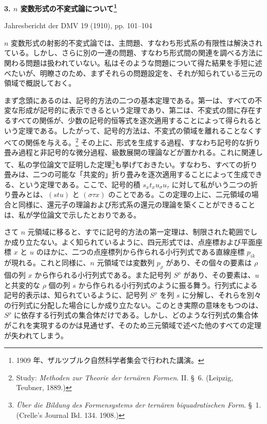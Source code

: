 \documentclass[11pt]{jlreq}
\newcommand{\pair}[2]{(#1\,|\,#2)}
\newcommand{\eps}{\varepsilon}
\begin{document}
\clearpage

\providecommand{\pair}[2]{(#1\,|\,#2)}
\providecommand{\eps}{\varepsilon}
\providecommand{\rhoidx}{\varrho}

\begin{center}
{\Large\bfseries 3. $n$ 変数形式の不変式論について\footnote{1909 年、ザルツブルク自然科学者集会で行われた講演。}}\par
\vspace{1.2em}
Jahresbericht der DMV 19 (1910), pp. 101--104
\end{center}

\vspace{1em}
$n$ 変数形式の射影的不変式論では、主問題、すなわち形式系の有限性は解決されている。しかし、さらに別の一連の問題、すなわち形式間の関連を調べる方法に関わる問題は扱われていない。私はそのような問題について得た結果を手短に述べたいが、明瞭さのため、まずそれらの問題設定を、それが知られている三元の領域で概説しておく。

まず念頭にあるのは、記号的方法の二つの基本定理である。第一は、すべての不変な形成が記号的に表示できるという定理であり、第二は、不変式の間に存在するすべての関係が、少数の記号的恒等式を逐次適用することによって得られるという定理である。したがって、記号的方法は、不変式の領域を離れることなくすべての関係を与える。\footnote{Study: \emph{Methoden zur Theorie der ternären Formen}. II. \S\ 6. (Leipzig, Teubner, 1889.)} その上に、形式を生成する過程、すなわち記号的な折り畳み過程と非記号的な微分過程、級数展開の理論などが置かれる。これに関連して、私の学位論文で証明した定理\footnote{\emph{Über die Bildung des Formensystems der ternären biquadratischen Form}. \S\ 1. (Crelle's Journal Bd. 134. 1908.)}も挙げておきたい。すなわち、すべての折り畳みは、二つの可能な「共変的」折り畳みを逐次適用することによって生成できる、という定理である。ここで、記号的積 $s_x t_x u_\sigma u_\tau$ に対して私がいう二つの折り畳みとは、$(stu)$ と $(\sigma\tau x)$ のことである。この定理の上に、二元領域の場合と同様に、還元子の理論および形式系の還元の理論を築くことができることは、私が学位論文で示したとおりである。

さて $n$ 元領域に移ると、すでに記号的方法の第一定理は、制限された範囲でしか成り立たない。よく知られているように、四元形式では、点座標および平面座標 $x$ と $u$ のほかに、二つの点座標列から作られる小行列式である直線座標 $p_{ik}$ が現れる。これと同様に、$n$ 元領域では変数列 $p_\rho$ があり、その個々の要素は $\rho$ 個の列 $x$ から作られる小行列式である。また記号列 $S^\rho$ があり、その要素は、$u$ と共変的な $\rho$ 個の列 $s$ から作られる小行列式のように振る舞う。行列式による記号的表示は、知られているように、記号列 $S^\rho$ を列 $s$ に分解し、それらを別々の行列式に分配した場合にしか成り立たない。このとき実際の意味をもつのは、$S^\rho$ に依存する行列式の集合体だけである。しかし、どのような行列式の集合体がこれを実現するのかは見通せず、そのため三元領域で述べた他のすべての定理が失われてしまう。
\end{document}
